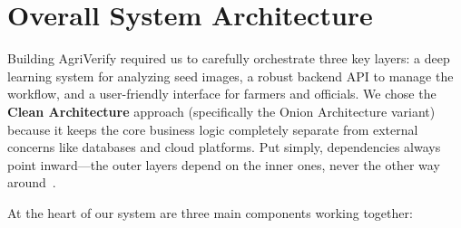 %


\section{Overall System Architecture}

Building AgriVerify required us to carefully orchestrate three key layers: a
deep learning system for analyzing seed images, a robust backend API to manage
the workflow, and a user-friendly interface for farmers and officials. We chose
the \textbf{Clean Architecture} approach (specifically the Onion Architecture
variant) because it keeps the core business logic completely separate from
external concerns like databases and cloud platforms. Put simply, dependencies
always point inward—the outer layers depend on the inner ones, never the other
way around~\cite{martin2018clean}.

At the heart of our system are three main components working together:

